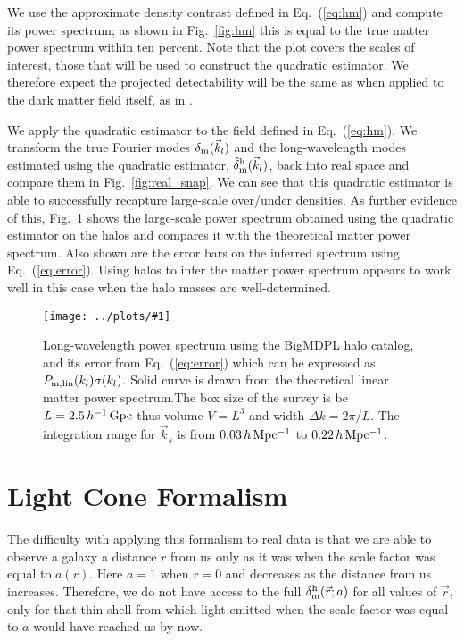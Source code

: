 \documentclass[prd,amsmath,amssymb,floatfix,superscriptaddress,nofootinbib,twocolumn]{revtex4-1}
\newcommand{\vk}{\vec{k}}
\newcommand{\ec}[1]{Eq.~(\ref{eq:#1})}
\newcommand{\rf}[1]{\ref{fig:#1}}
\newcommand{\sfig}[2]{
\texttt{[image: ../plots/\#1]}
        }
\newcommand{\Sfig}[2]{
   \begin{figure}[thbp]
   \begin{center}
    \sfig{../plots/#1.pdf}{\columnwidth}
    \caption{{\small #2}}
    \label{fig:#1}
     \end{center}
   \end{figure}
}
\newcommand\dmh{\delta_{\rm m}^{\rm h}}
\newcommand\hdmh{\hat{\delta}_{\rm m}^{\rm h}}
\begin{document}
We use the approximate density contrast defined in \ec{hm} and compute its power spectrum; as shown in Fig.~\rf{hm} this is equal to the true matter power spectrum within ten percent. Note that the plot covers the scales of interest, those that will be used to construct the quadratic estimator.
We therefore expect the projected detectability will be the same as when applied to the dark matter field itself, as in  \cite{Li:2020fir}. 

We apply the quadratic estimator to the field defined in \ec{hm}. We transform the true Fourier modes $\delta_{\rm m}(\vk_l)$ and the long-wavelength modes estimated using the quadratic estimator, $\hdmh(\vk_l)$, back into real space and compare them in Fig.~\rf{real_snap}. We can see that this quadratic estimator is able to successfully recapture large-scale over/under densities. 
As further evidence of this, 
Fig.~\rf{SN_BIGMDPL} shows the large-scale power spectrum obtained using the quadratic estimator on the halos and compares it with the theoretical matter power spectrum. Also shown are the error bars on the inferred spectrum using \ec{error}. Using halos to infer the matter power spectrum appears to work well in this case when the halo masses are well-determined.




\Sfig{SN_BIGMDPL}{Long-wavelength power spectrum using the BigMDPL halo catalog, and its error from \ec{error} which can be expressed as $P_{\rm m, lin}(k_l)\sigma(k_l)$. Solid curve is drawn from the theoretical linear matter power spectrum.The box size of the survey is be $L=2.5\, h^{-1}\rm\, Gpc$ thus volume $V=L^3$ and width $\Delta k = 2\pi/L$. The integration range for $\vk_s$ is from $0.03 \,h \,\rm Mpc^{-1}$ to $0.22\,h\,\rm Mpc^{-1}$.}

 

\section{Light Cone Formalism} \label{sec4}

The difficulty with applying this formalism to real data is that we are able to observe a galaxy a distance $r$ from us only as it was when the scale factor was equal to $a(r)$. Here $a=1$ when $r=0$ and decreases as the distance from us increases. Therefore, we do not have access to the full $\dmh(\vec r; a)$ for all values of $\vec r$, only for that thin shell from which light emitted when the scale factor was equal to $a$ would have reached us by now.
\end{document}
